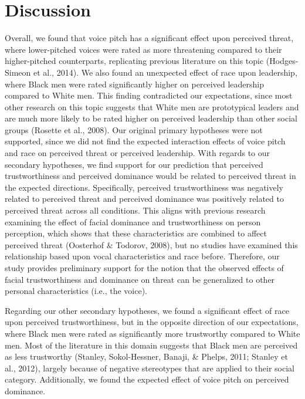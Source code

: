 \documentclass[
  english,
  man, noextraspace,floatsintext]{apa6}
\begin{document}
\hypertarget{discussion}{%
\section{Discussion}\label{discussion}}

Overall, we found that voice pitch has a significant effect upon perceived threat, where lower-pitched voices were rated as more threatening compared to their higher-pitched counterparts, replicating previous literature on this topic (Hodges-Simeon et al., 2014). We also found an unexpected effect of race upon leadership, where Black men were rated significantly higher on perceived leadership compared to White men. This finding contradicted our expectations, since most other research on this topic suggests that White men are prototypical leaders and are much more likely to be rated higher on perceived leadership than other social groups (Rosette et al., 2008). Our original primary hypotheses were not supported, since we did not find the expected interaction effects of voice pitch and race on perceived threat or perceived leadership. With regards to our secondary hypotheses, we find support for our prediction that perceived trustworthiness and perceived dominance would be related to perceived threat in the expected directions. Specifically, perceived trustworthiness was negatively related to perceived threat and perceived dominance was positively related to perceived threat across all conditions. This aligns with previous research examining the effect of facial dominance and trustworthiness on person perception, which shows that these characteristics are combined to affect perceived threat (Oosterhof \& Todorov, 2008), but no studies have examined this relationship based upon vocal characteristics and race before. Therefore, our study provides preliminary support for the notion that the observed effects of facial trustworthiness and dominance on threat can be generalized to other personal characteristics (i.e., the voice).

Regarding our other secondary hypotheses, we found a significant effect of race upon perceived trustworthiness, but in the opposite direction of our expectations, where Black men were rated as significantly more trustworthy compared to White men. Most of the literature in this domain suggests that Black men are perceived as less trustworthy (Stanley, Sokol-Hessner, Banaji, \& Phelps, 2011; Stanley et al., 2012), largely because of negative stereotypes that are applied to their social category. Additionally, we found the expected effect of voice pitch on perceived dominance.
\end{document}
